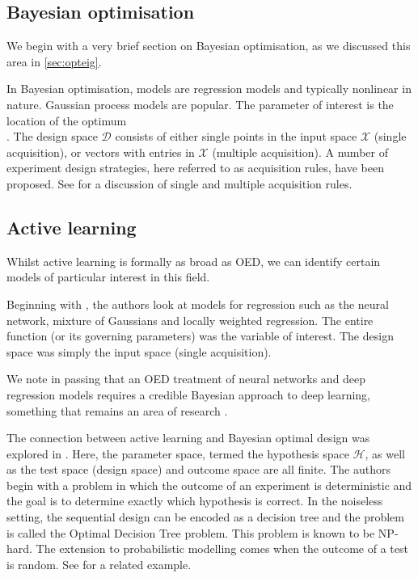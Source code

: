 \subsection{Bayesian optimisation}
We begin with a very brief section on Bayesian optimisation, as we discussed this area in \ref{sec:opteig}.

In Bayesian optimisation, models are regression models and typically nonlinear in nature. Gaussian process models are popular. The parameter of interest is the location of the optimum \\ \cite{pes}. The design space $\mathcal{D}$ consists of either single points in the input space $\mathcal{X}$ (single acquisition), or vectors with entries in $\mathcal{X}$ (multiple acquisition). A number of experiment design strategies, here referred to as acquisition rules, have been proposed. See \cite{ginsbourger2008, azimi2012} for a discussion of single and multiple acquisition rules.

\subsection{Active learning}
Whilst active learning is formally as broad as OED, we can identify certain models of particular interest in this field.

Beginning with \cite{cohn1996}, the authors look at models for regression such as the neural network, mixture of Gaussians and locally weighted regression. The entire function (or its governing parameters) was the variable of interest. The design space was simply the input space (single acquisition).

We note in passing that an OED treatment of neural networks and deep regression models requires a credible Bayesian approach to deep learning, something that remains an area of research \cite{gal2016}.

The connection between active learning and Bayesian optimal design was explored in \cite{golovin2010}. Here, the parameter space, termed the hypothesis space $\mathcal{H}$, as well as the test space (design space) and outcome space are all finite. The authors begin with a problem in which the outcome of an experiment is deterministic and the goal is to determine exactly which hypothesis is correct. In the noiseless setting, the sequential design can be encoded as a decision tree and the problem is called the Optimal Decision Tree problem. This problem is known to be NP-hard. The extension to probabilistic modelling comes when the outcome of a test is random. See \cite{nowak2009} for a related example.


